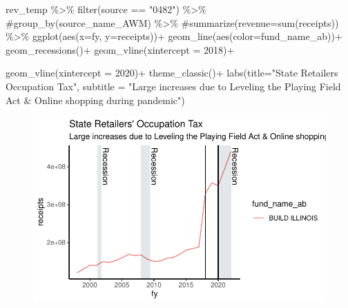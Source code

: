 \documentclass[
  letterpaper,
  DIV=11,
  numbers=noendperiod]{scrreport}
\newenvironment{Shaded}{\begin{snugshade}}{\end{snugshade}}
\newcommand{\AttributeTok}[1]{\textcolor[rgb]{0.40,0.45,0.13}{#1}}
\newcommand{\CommentTok}[1]{\textcolor[rgb]{0.37,0.37,0.37}{#1}}
\newcommand{\DecValTok}[1]{\textcolor[rgb]{0.68,0.00,0.00}{#1}}
\newcommand{\FunctionTok}[1]{\textcolor[rgb]{0.28,0.35,0.67}{#1}}
\newcommand{\NormalTok}[1]{\textcolor[rgb]{0.00,0.23,0.31}{#1}}
\newcommand{\SpecialCharTok}[1]{\textcolor[rgb]{0.37,0.37,0.37}{#1}}
\newcommand{\StringTok}[1]{\textcolor[rgb]{0.13,0.47,0.30}{#1}}
\begin{document}
\begin{Shaded}
\begin{Highlighting}[]
\NormalTok{rev\_temp }\SpecialCharTok{\%\textgreater{}\%} 
  \FunctionTok{filter}\NormalTok{(source }\SpecialCharTok{==} \StringTok{"0482"}\NormalTok{) }\SpecialCharTok{\%\textgreater{}\%}
  \CommentTok{\#group\_by(source\_name\_AWM) \%\textgreater{}\% }
  \CommentTok{\#summarize(revenue=sum(receipts))  \%\textgreater{}\% }
  \FunctionTok{ggplot}\NormalTok{(}\FunctionTok{aes}\NormalTok{(}\AttributeTok{x=}\NormalTok{fy, }\AttributeTok{y=}\NormalTok{receipts))}\SpecialCharTok{+}
  \FunctionTok{geom\_line}\NormalTok{(}\FunctionTok{aes}\NormalTok{(}\AttributeTok{color=}\NormalTok{fund\_name\_ab))}\SpecialCharTok{+}
  \FunctionTok{geom\_recessions}\NormalTok{()}\SpecialCharTok{+}
  \FunctionTok{geom\_vline}\NormalTok{(}\AttributeTok{xintercept =} \DecValTok{2018}\NormalTok{)}\SpecialCharTok{+}

  \FunctionTok{geom\_vline}\NormalTok{(}\AttributeTok{xintercept =} \DecValTok{2020}\NormalTok{)}\SpecialCharTok{+}
  \FunctionTok{theme\_classic}\NormalTok{()}\SpecialCharTok{+}
  \FunctionTok{labs}\NormalTok{(}\AttributeTok{title=}\StringTok{"State Retailers\textquotesingle{} Occupation Tax"}\NormalTok{,}
       \AttributeTok{subtitle =} \StringTok{"Large increases due to Leveling the Playing Field Act \& Online shopping during pandemic"}\NormalTok{)}
\end{Highlighting}
\end{Shaded}

\begin{figure}[H]

{\centering \includegraphics{./Everything_files/figure-pdf/unnamed-chunk-13-2.pdf}

}

\end{figure}
\end{document}
